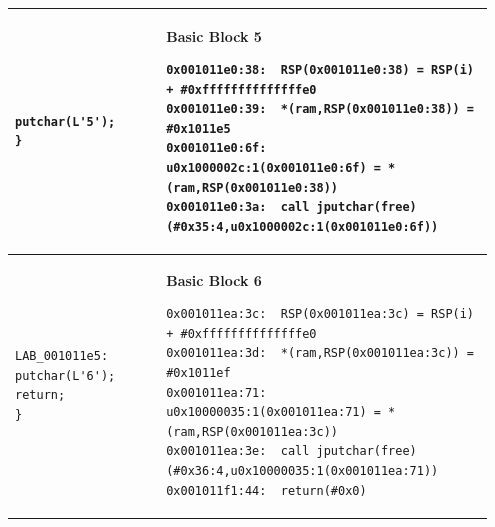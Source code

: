 \begin{longtable}{|p{0.30\linewidth}|p{0.65\linewidth}|}
    \begin{minipage}[t]{\linewidth}
        \vspace{1mm}
        \begin{lstlisting}[style=CStyle]
putchar(L'5');
}
        \end{lstlisting}
        \vspace{1mm}
    \end{minipage}
    & 
    \begin{minipage}[t]{\linewidth}
        \vspace{1mm}
        \textbf{\scriptsize Basic Block 5}
        \begin{lstlisting}[style=PCodeStyle]
0x001011e0:38:	RSP(0x001011e0:38) = RSP(i) + #0xffffffffffffffe0
0x001011e0:39:	*(ram,RSP(0x001011e0:38)) = #0x1011e5
0x001011e0:6f:	u0x1000002c:1(0x001011e0:6f) = *(ram,RSP(0x001011e0:38))
0x001011e0:3a:	call jputchar(free)(#0x35:4,u0x1000002c:1(0x001011e0:6f))
        \end{lstlisting}
        \vspace{1mm}
    \end{minipage}
    \\ \hline

    \begin{minipage}[t]{\linewidth}
        \vspace{1mm}
        \begin{lstlisting}[style=CStyle]
LAB_001011e5:
putchar(L'6');
return;
}
        \end{lstlisting}
        \vspace{1mm}
    \end{minipage}
    & 
    \begin{minipage}[t]{\linewidth}
        \vspace{1mm}
        \textbf{\scriptsize Basic Block 6}
        \begin{lstlisting}[style=PCodeStyle]
0x001011ea:3c:	RSP(0x001011ea:3c) = RSP(i) + #0xffffffffffffffe0
0x001011ea:3d:	*(ram,RSP(0x001011ea:3c)) = #0x1011ef
0x001011ea:71:	u0x10000035:1(0x001011ea:71) = *(ram,RSP(0x001011ea:3c))
0x001011ea:3e:	call jputchar(free)(#0x36:4,u0x10000035:1(0x001011ea:71))
0x001011f1:44:	return(#0x0)
        \end{lstlisting}
        \vspace{1mm}
    \end{minipage}
    \\ \hline

\end{longtable}

